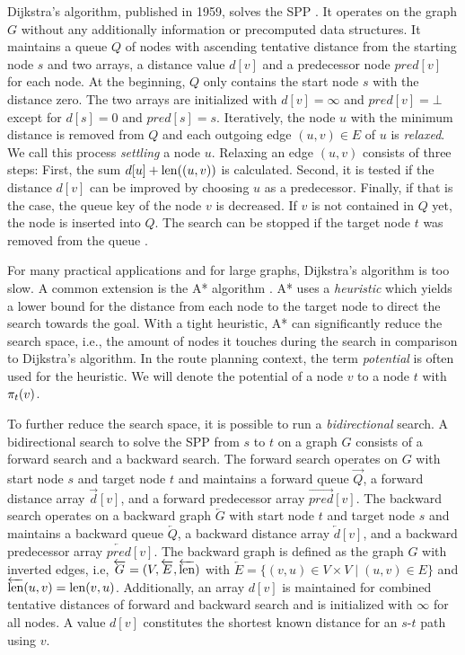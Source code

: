 Dijkstra's algorithm, published in 1959, solves the SPP \cite{dijkstra:1959}. It operates on the graph $G$ without any additionally information or precomputed data structures. It maintains a queue $Q$ of nodes with ascending tentative distance from the starting node $s$ and two arrays, a distance value $d[v]$ and a predecessor node $pred[v]$ for each node. At the beginning, $Q$ only contains the start node $s$ with the distance zero. The two arrays are initialized with $d[v]=\infty$ and $pred[v]=\bot$ except for $d[s]=0$ and $pred[s]=s$. Iteratively, the node $u$ with the minimum distance is removed from $Q$ and each outgoing edge $(u,v) \in E$ of $u$ is \emph{relaxed}. We call this process \emph{settling} a node $u$. Relaxing an edge $(u,v)$ consists of three steps: First, the sum $d[u] + \operatorname{len}((u,v))$ is calculated. Second, it is tested if the distance $d[v]$ can be improved by choosing $u$ as a predecessor. Finally, if that is the case, the queue key of the node $v$ is decreased. If $v$ is not contained in $Q$ yet, the node is inserted into $Q$. The search can be stopped if the target node $t$ was removed from the queue \cite{dijkstra:1959}.

For many practical applications and for large graphs, Dijkstra's algorithm is too slow. A common extension is the A* algorithm \cite{hart:1968}. A* uses a \emph{heuristic} which yields a lower bound for the distance from each node to the target node to direct the search towards the goal. With a tight heuristic, A* can significantly reduce the search space, i.e., the amount of nodes it touches during the search in comparison to Dijkstra's algorithm. In the route planning context, the term \emph{potential} is often used for the heuristic. We will denote the potential of a node $v$ to a node $t$ with $\pi_t(v)$.

To further reduce the search space, it is possible to run a \emph{bidirectional} search. A bidirectional search to solve the SPP from $s$ to $t$ on a graph $G$ consists of a forward search and a backward search. The forward search operates on $G$ with start node $s$ and target node $t$ and maintains a forward queue $\overrightarrow{Q}$, a forward distance array $\overrightarrow{d}[v]$, and a forward predecessor array $\overrightarrow{pred}[v]$. The backward search operates on a backward graph $\overleftarrow{G}$ with start node $t$ and target node $s$ and maintains a backward queue $\overleftarrow{Q}$, a backward distance array $\overleftarrow{d}[v]$, and a backward predecessor array $\overleftarrow{pred}[v]$. The backward graph is defined as the graph $G$ with inverted edges, i.e, $\overleftarrow{G} = (V,\overleftarrow{E},\overleftarrow{\operatorname{len}})$ with $\overleftarrow{E} = \{(v,u) \in V \times V \mid (u,v) \in E\}$ and $\overleftarrow{\operatorname{len}}(u,v) = \operatorname{len}(v,u)$. Additionally, an array $d[v]$ is maintained for combined tentative distances of forward and backward search and is initialized with $\infty$ for all nodes. A value $d[v]$ constitutes the shortest known distance for an $s$-$t$ path using $v$.

